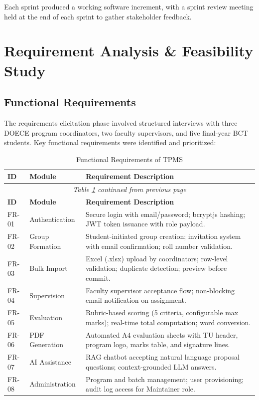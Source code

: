 \documentclass[12pt]{report}
\begin{document}
Each sprint produced a working software increment, with a sprint review meeting held at the end of each sprint to gather stakeholder feedback.

\section{Requirement Analysis \& Feasibility Study}

\subsection{Functional Requirements}

The requirements elicitation phase involved structured interviews with three DOECE program coordinators, two faculty supervisors, and five final-year BCT students. Key functional requirements were identified and prioritized:

\begin{longtable}{p{1.2cm} p{3.5cm} p{8cm}}
\caption{Functional Requirements of TPMS}\label{tab:func_req}\\
\toprule
\textbf{ID} & \textbf{Module} & \textbf{Requirement Description}\\
\midrule
\endfirsthead
\multicolumn{3}{c}{\textit{Table \ref{tab:func_req} continued from previous page}}\\
\toprule \textbf{ID} & \textbf{Module} & \textbf{Requirement Description}\\ \midrule
\endhead
\bottomrule \endlastfoot
FR-01 & Authentication & Secure login with email/password; bcryptjs hashing; JWT token issuance with role payload.\\
FR-02 & Group Formation & Student-initiated group creation; invitation system with email confirmation; roll number validation.\\
FR-03 & Bulk Import & Excel (.xlsx) upload by coordinators; row-level validation; duplicate detection; preview before commit.\\
FR-04 & Supervision & Faculty supervisor acceptance flow; non-blocking email notification on assignment.\\
FR-05 & Evaluation & Rubric-based scoring (5 criteria, configurable max marks); real-time total computation; word conversion.\\
FR-06 & PDF Generation & Automated A4 evaluation sheets with TU header, program logo, marks table, and signature lines.\\
FR-07 & AI Assistance & RAG chatbot accepting natural language proposal questions; context-grounded LLM answers.\\
FR-08 & Administration & Program and batch management; user provisioning; audit log access for Maintainer role.\\
\end{longtable}
\end{document}
